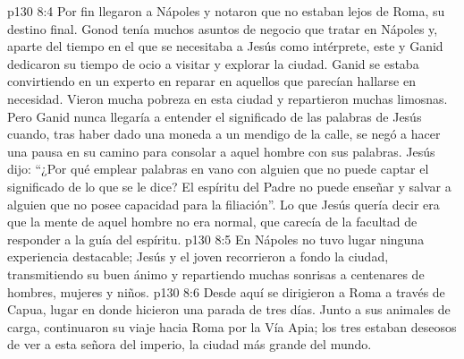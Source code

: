 \vs p130 8:4 \pc Por fin llegaron a Nápoles y notaron que no estaban lejos de Roma, su destino final. Gonod tenía muchos asuntos de negocio que tratar en Nápoles y, aparte del tiempo en el que se necesitaba a Jesús como intérprete, este y Ganid dedicaron su tiempo de ocio a visitar y explorar la ciudad. Ganid se estaba convirtiendo en un experto en reparar en aquellos que parecían hallarse en necesidad. Vieron mucha pobreza en esta ciudad y repartieron muchas limosnas. Pero Ganid nunca llegaría a entender el significado de las palabras de Jesús cuando, tras haber dado una moneda a un mendigo de la calle, se negó a hacer una pausa en su camino para consolar a aquel hombre con sus palabras. Jesús dijo: “¿Por qué emplear palabras en vano con alguien que no puede captar el significado de lo que se le dice? El espíritu del Padre no puede enseñar y salvar a alguien que no posee capacidad para la filiación”. Lo que Jesús quería decir era que la mente de aquel hombre no era normal, que carecía de la facultad de responder a la guía del espíritu.
\vs p130 8:5 En Nápoles no tuvo lugar ninguna experiencia destacable; Jesús y el joven recorrieron a fondo la ciudad, transmitiendo su buen ánimo y repartiendo muchas sonrisas a centenares de hombres, mujeres y niños.
\vs p130 8:6 Desde aquí se dirigieron a Roma a través de Capua, lugar en donde hicieron una parada de tres días. Junto a sus animales de carga, continuaron su viaje hacia Roma por la Vía Apia; los tres estaban deseosos de ver a esta señora del imperio, la ciudad más grande del mundo.
